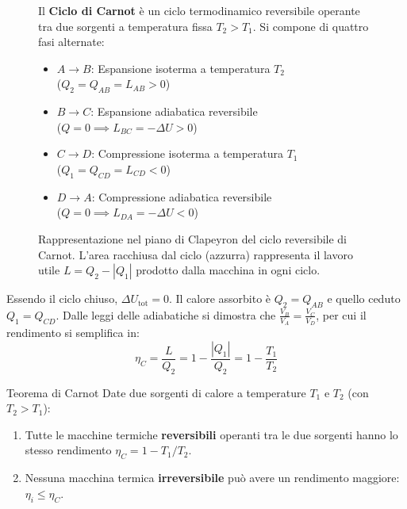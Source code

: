 \begin{figure}[ht]
\begin{minipage}{0.48\textwidth}
\end{minipage}\hfill
\begin{minipage}{0.50\textwidth}
Il \textbf{Ciclo di Carnot} è un ciclo termodinamico reversibile operante tra due sorgenti a temperatura fissa $T_2 > T_1$. Si compone di quattro fasi alternate:
\begin{itemize}
    \item \textbf{$A \to B$}: Espansione isoterma a temperatura $T_2$ \\
    ($Q_2 = Q_{AB} = L_{AB} > 0$)
    \item \textbf{$B \to C$}: Espansione adiabatica reversibile \\
    ($Q = 0 \implies L_{BC} = -\Delta U > 0$)
    \item \textbf{$C \to D$}: Compressione isoterma a temperatura $T_1$ \\
    ($Q_1 = Q_{CD} = L_{CD} < 0$)
    \item \textbf{$D \to A$}: Compressione adiabatica reversibile \\
    ($Q = 0 \implies L_{DA} = -\Delta U < 0$)
\end{itemize}
\end{minipage}
\caption{Rappresentazione nel piano di Clapeyron del ciclo reversibile di Carnot. L'area racchiusa dal ciclo (azzurra) rappresenta il lavoro utile $L = Q_2 - |Q_1|$ prodotto dalla macchina in ogni ciclo.}
\end{figure}

Essendo il ciclo chiuso, $\Delta U_{\text{tot}} = 0$. Il calore assorbito è $Q_2 = Q_{AB}$ e quello ceduto $Q_1 = Q_{CD}$. Dalle leggi delle adiabatiche si dimostra che $\frac{V_B}{V_A} = \frac{V_C}{V_D}$, per cui il rendimento si semplifica in:
\begin{equation}
    \eta_C = \frac{L}{Q_2} = 1 - \frac{|Q_1|}{Q_2} = 1 - \frac{T_1}{T_2}
\end{equation}

\begin{teorema}{Teorema di Carnot}
Date due sorgenti di calore a temperature $T_1$ e $T_2$ (con $T_2 > T_1$):
\begin{enumerate}
    \item Tutte le macchine termiche \textbf{reversibili} operanti tra le due sorgenti hanno lo stesso rendimento $\eta_C = 1 - T_1/T_2$.
    \item Nessuna macchina termica \textbf{irreversibile} può avere un rendimento maggiore: $\eta_i \le \eta_C$.
\end{enumerate}
\end{teorema}


